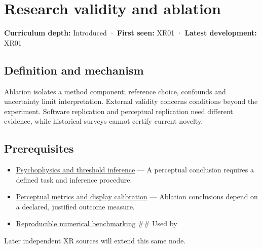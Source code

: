 \hypertarget{appendix-65788587ef78}{}\label{referencestart:appendix-65788587ef78}
\section{Research validity and ablation}\label{appendix-65788587ef78-research-validity-and-ablation}

\textbf{Curriculum depth:} Introduced · \textbf{First seen:} XR01 · \textbf{Latest development:} XR01

\begin{allmightroledefinition}

\subsection{Definition and mechanism}\label{appendix-65788587ef78-definition-and-mechanism}

Ablation isolates a method component; reference choice, confounds and uncertainty limit interpretation. External validity concerns conditions beyond the experiment. Software replication and perceptual replication need different evidence, while historical surveys cannot certify current novelty.

\end{allmightroledefinition}

\subsection{Prerequisites}\label{appendix-65788587ef78-prerequisites}

\begin{itemize}
\item
  \hyperref[appendix-1759f03e8ce7]{Psychophysics and threshold inference} --- A perceptual conclusion requires a defined task and inference procedure.
\item
  \hyperref[appendix-b2c1846508bf]{Perceptual metrics and display calibration} --- Ablation conclusions depend on a declared, justified outcome measure.
\item
  \hyperref[appendix-b9db93e28371]{Reproducible numerical benchmarking} \#\# Used by
\end{itemize}

Later independent XR sources will extend this same node.

